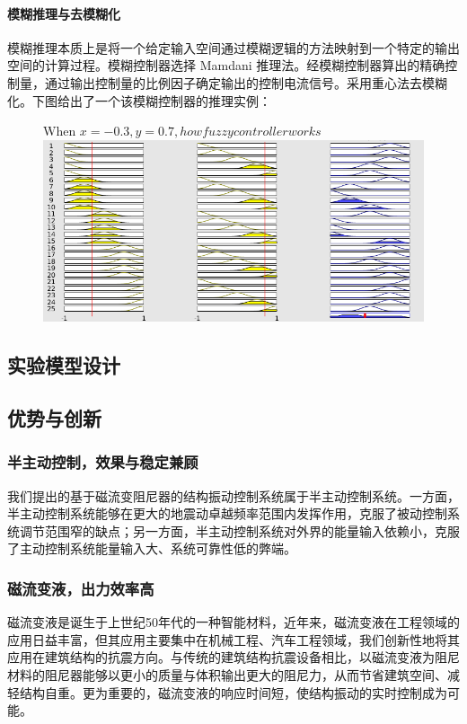\paragraph{模糊推理与去模糊化}
\qquad 模糊推理本质上是将一个给定输入空间通过模糊逻辑的方法映射到一个特定的输出空间的计算过程。模糊控制器选择 Mamdani 推理法。经模糊控制器算出的精确控制量，通过输出控制量的比例因子确定输出的控制电流信号。采用重心法去模糊化。下图给出了一个该模糊控制器的推理实例：

\begin{figure}[H]
\centering
{}
{When $x=-0.3,y=0.7, how fuzzy controller works$}
\includegraphics[width=0.5\linewidth]{figure/fuzzyeg}
\end{figure}


%

\subsection{实验模型设计}

\subsection{优势与创新}

\subsubsection{半主动控制，效果与稳定兼顾}
我们提出的基于磁流变阻尼器的结构振动控制系统属于半主动控制系统。一方面，半主动控制系统能够在更大的地震动卓越频率范围内发挥作用，克服了被动控制系统调节范围窄的缺点；另一方面，半主动控制系统对外界的能量输入依赖小，克服了主动控制系统能量输入大、系统可靠性低的弊端。

\subsubsection{磁流变液，出力效率高}
磁流变液是诞生于上世纪50年代的一种智能材料，近年来，磁流变液在工程领域的应用日益丰富，但其应用主要集中在机械工程、汽车工程领域，我们创新性地将其应用在建筑结构的抗震方向。与传统的建筑结构抗震设备相比，以磁流变液为阻尼材料的阻尼器能够以更小的质量与体积输出更大的阻尼力，从而节省建筑空间、减轻结构自重。更为重要的，磁流变液的响应时间短，使结构振动的实时控制成为可能。

